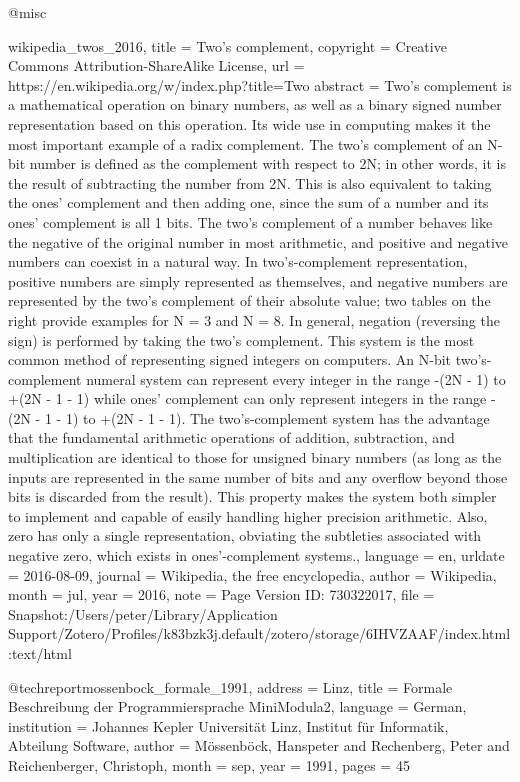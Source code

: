 {@misc{wikipedia_twos_2016,
	title = {Two's complement},
	copyright = {Creative Commons Attribution-ShareAlike License},
	url = {https://en.wikipedia.org/w/index.php?title=Two%
	abstract = {Two's complement is a mathematical operation on binary numbers, as well as a binary signed number representation based on this operation. Its wide use in computing makes it the most important example of a radix complement.
The two's complement of an N-bit number is defined as the complement with respect to 2N; in other words, it is the result of subtracting the number from 2N. This is also equivalent to taking the ones' complement and then adding one, since the sum of a number and its ones' complement is all 1 bits. The two's complement of a number behaves like the negative of the original number in most arithmetic, and positive and negative numbers can coexist in a natural way.
In two's-complement representation, positive numbers are simply represented as themselves, and negative numbers are represented by the two's complement of their absolute value; two tables on the right provide examples for N = 3 and N = 8. In general, negation (reversing the sign) is performed by taking the two's complement. This system is the most common method of representing signed integers on computers. An N-bit two's-complement numeral system can represent every integer in the range -(2N - 1) to +(2N - 1 - 1) while ones' complement can only represent integers in the range -(2N - 1 - 1) to +(2N - 1 - 1).
The two's-complement system has the advantage that the fundamental arithmetic operations of addition, subtraction, and multiplication are identical to those for unsigned binary numbers (as long as the inputs are represented in the same number of bits and any overflow beyond those bits is discarded from the result). This property makes the system both simpler to implement and capable of easily handling higher precision arithmetic. Also, zero has only a single representation, obviating the subtleties associated with negative zero, which exists in ones'-complement systems.},
	language = {en},
	urldate = {2016-08-09},
	journal = {Wikipedia, the free encyclopedia},
	author = {{Wikipedia}},
	month = jul,
	year = {2016},
	note = {Page Version ID: 730322017},
	file = {Snapshot:/Users/peter/Library/Application Support/Zotero/Profiles/k83bzk3j.default/zotero/storage/6IHVZAAF/index.html:text/html}
}

@techreport{mossenbock_formale_1991,
	address = {Linz},
	title = {Formale {Beschreibung} der {Programmiersprache} {MiniModula}2},
	language = {German},
	institution = {Johannes Kepler Universit{\"a}t Linz, Institut f{\"u}r Informatik, Abteilung Software},
	author = {M{\"o}ssenb{\"o}ck, Hanspeter and Rechenberg, Peter and Reichenberger, Christoph},
	month = sep,
	year = {1991},
	pages = {45}
}

}}
